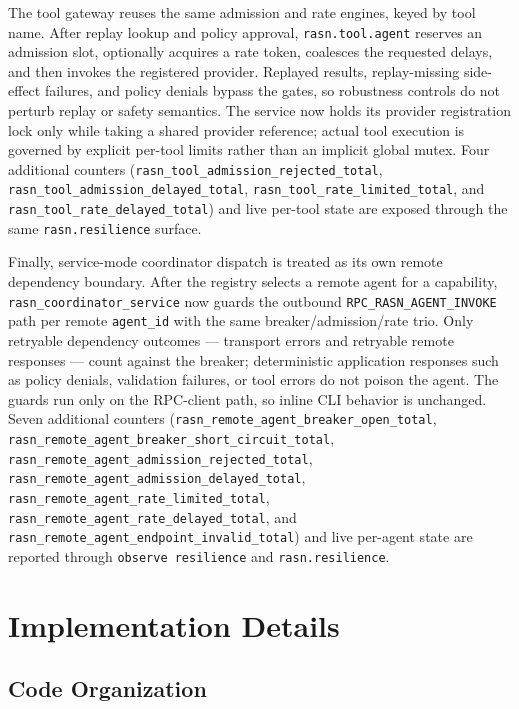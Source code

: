 \documentclass[manuscript,screen,review]{acmart}
\begin{document}
The tool gateway reuses the same admission and rate engines, keyed by tool name.
After replay lookup and policy approval, \texttt{rasn.tool.agent} reserves an
admission slot, optionally acquires a rate token, coalesces the requested delays,
and then invokes the registered provider. Replayed results, replay-missing
side-effect failures, and policy denials bypass the gates, so robustness controls do
not perturb replay or safety semantics. The service now holds its provider
registration lock only while taking a shared provider reference; actual tool
execution is governed by explicit per-tool limits rather than an implicit global
mutex. Four additional counters
(\texttt{rasn\_tool\_admission\_rejected\_total},
\texttt{rasn\_tool\_admission\_delayed\_total},
\texttt{rasn\_tool\_rate\_limited\_total}, and
\texttt{rasn\_tool\_rate\_delayed\_total}) and live per-tool state are exposed
through the same \texttt{rasn.resilience} surface.

Finally, service-mode coordinator dispatch is treated as its own remote
dependency boundary. After the registry selects a remote agent for a capability,
\texttt{rasn\_coordinator\_service} now guards the outbound
\texttt{RPC\_RASN\_AGENT\_INVOKE} path per remote \texttt{agent\_id} with the same
breaker/admission/rate trio. Only retryable dependency outcomes --- transport
errors and retryable remote responses --- count against the breaker; deterministic
application responses such as policy denials, validation failures, or tool errors
do not poison the agent. The guards run only on the RPC-client path, so inline CLI
behavior is unchanged. Seven additional counters
(\texttt{rasn\_remote\_agent\_breaker\_open\_total},
\texttt{rasn\_remote\_agent\_breaker\_short\_circuit\_total},
\texttt{rasn\_remote\_agent\_admission\_rejected\_total},
\texttt{rasn\_remote\_agent\_admission\_delayed\_total},
\texttt{rasn\_remote\_agent\_rate\_limited\_total},
\texttt{rasn\_remote\_agent\_rate\_delayed\_total}, and
\texttt{rasn\_remote\_agent\_endpoint\_invalid\_total}) and live per-agent state are
reported through \texttt{observe resilience} and \texttt{rasn.resilience}.

\section{Implementation Details}

\subsection{Code Organization}
\end{document}
